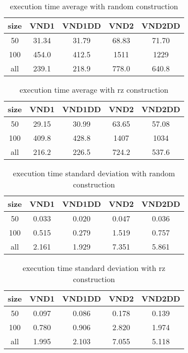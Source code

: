 \documentclass[12pt,a4paper]{article}
\begin{document}
\begin{table}[!h]
\centering
\begin{tabular}{|*{5}{c|}}
  \hline
  size & VND1 & VND1DD & VND2 & VND2DD\\
  \hline
  50 & 31.34 & 31.79 & 68.83 & 71.70 \\ 
  100 & 454.0 & 412.5 & 1511 & 1229 \\
  all & 239.1 & 218.9 & 778.0 & 640.8 \\
  \hline
\end{tabular}
\caption{execution time average with random construction}
\label{execution time of VND with random construction}
\end{table}

\begin{table}[!h]
\centering
\begin{tabular}{|*{5}{c|}}
  \hline
  size & VND1 & VND1DD & VND2 & VND2DD\\
  \hline
  50 & 29.15 & 30.99 & 63.65 & 57.08 \\ 
  100 & 409.8 & 428.8 & 1407 & 1034 \\
  all & 216.2 & 226.5 & 724.2 & 537.6 \\
  \hline
\end{tabular}
\caption{execution time average with rz construction}
\label{execution time of VND with rz construction}
\end{table}

\begin{table}[!h]
\centering
\begin{tabular}{|*{5}{c|}}
  \hline
  size & VND1 & VND1DD & VND2 & VND2DD\\
  \hline
  50 & 0.033 & 0.020 & 0.047 & 0.036 \\ 
  100 & 0.515 & 0.279 & 1.519 & 0.757 \\
  all & 2.161 & 1.929 & 7.351 & 5.861 \\
  \hline
\end{tabular}
\caption{execution time standard deviation with random construction}
\label{execution time of VND with random construction sd}
\end{table}

\begin{table}[!h]
\centering
\begin{tabular}{|*{5}{c|}}
  \hline
  size & VND1 & VND1DD & VND2 & VND2DD\\
  \hline
  50 & 0.097 & 0.086 & 0.178 & 0.139 \\ 
  100 & 0.780 & 0.906 & 2.820 & 1.974 \\
  all & 1.995 & 2.103 & 7.055 & 5.118 \\
  \hline
\end{tabular}
\caption{execution time standard deviation with rz construction}
\label{execution time of VND with rz construction sd}
\end{table}
\end{document}
